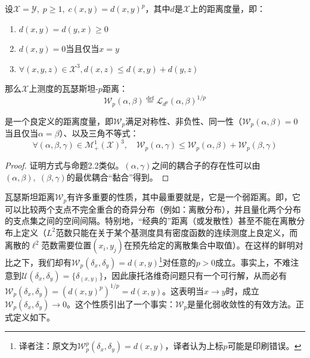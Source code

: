 \documentclass[cn,10pt,math=newtx,citestyle=gb7714-2015,bibstyle=gb7714-2015]{elegantbook}
\begin{document}
\begin{proposition}
设$\mathcal{X}=\mathcal{Y},\;p\geq 1,\; c(x,y)=d(x,y)^p$，其中$d$是$\mathcal{X}$上的距离度量，即：

\begin{enumerate}
    \item $d(x,y)=d(y,x)\geq 0$
    \item $d(x,y)=0$当且仅当$x=y$
    \item $\forall (x,y,z)\in\mathcal{X}^3,d(x,z)\leq d(x,y)+d(y,z)$
\end{enumerate}

那么$\mathcal{X}$上测度的瓦瑟斯坦-$p$距离：
\begin{equation}
    \label{2.18}
    \mathcal{W}_p(\alpha,\beta)\overset{\text{def}}{=}\mathcal{L}_{d^p}(\alpha,\beta)^{1/p}
\end{equation}

是一个良定义的距离度量，即$\mathcal{W}_p$满足对称性、非负性、同一性（$\mathcal{W}_p(\alpha,\beta)=0$当且仅当$\alpha=\beta$）、以及三角不等式：
\begin{equation*}
\forall (\alpha,\beta,\gamma)\in\mathcal{M}_+^1(\mathcal{X})^3,\quad \mathcal{W}_p(\alpha,\gamma)\leq \mathcal{W}_p(\alpha,\beta)+\mathcal{W}_p(\beta,\gamma)
\end{equation*}

\end{proposition}

\begin{proof}
证明方式与命题2.2类似。$(\alpha,\gamma)$之间的耦合子的存在性可以由$(\alpha,\beta),\;(\beta,\gamma)$的最优耦合“黏合”得到。
\end{proof}

\begin{postulate}[几何直观解释与弱收敛性]
瓦瑟斯坦距离$\mathcal{W}_p$有许多重要的性质，其中最重要就是，它是一个弱距离。即，它可以比较两个支点不完全重合的奇异分布（例如：离散分布），并且量化两个分布的支点集之间的空间间隔。特别地，“经典的”距离（或发散性）甚至不能在离散分布上定义（$L^2$范数只能在关于某个基测度具有密度函数的连续测度上良定义，而离散的$\ell^2$范数需要位置$(x_i,y_j)$在预先给定的离散集合中取值）。在这样的鲜明对比之下，我们却有$\mathcal{W}_p(\delta_x,\delta_y)=d(x,y)$\footnote{译者注：原文为$\mathcal{W}_p^p(\delta_x,\delta_y)=d(x,y)$，译者认为上标$p$可能是印刷错误。}对任意的$p>0$成立。事实上，不难注意到$\mathcal{U}(\delta_x,\delta_y)=\{\delta_{(x,y)}\}$，因此康托洛维奇问题只有一个可行解，从而必有$\mathcal{W}_p(\delta_x,\delta_y)=(d(x,y)^p)^{1/p}=d(x,y)$。这表明当$x\to y$时，成立$\mathcal{W}_p(\delta_x,\delta_y)\to 0$。这个性质引出了一个事实：$\mathcal{W}_p$是量化弱收敛性的有效方法。正式定义如下。
\end{postulate}
\end{document}
